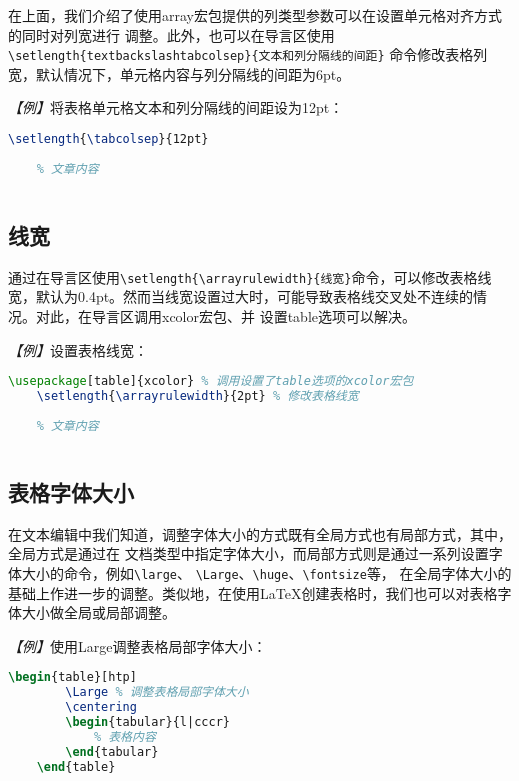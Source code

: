 在上面，我们介绍了使用array宏包提供的列类型参数可以在设置单元格对齐方式的同时对列宽进行
调整。此外，也可以在导言区使用\texttt{\textbackslash{}setlength\{textbackslash{}tabcolsep\}\{文本和列分隔线的间距\}}
命令修改表格列宽，默认情况下，单元格内容与列分隔线的间距为6pt。

\emph{【例】}将表格单元格文本和列分隔线的间距设为12pt：
\begin{lstlisting}[language=TeX]
    \setlength{\tabcolsep}{12pt}
    
    % 文章内容
    
\end{lstlisting}

\subsection{线宽}

通过在导言区使用\texttt{\textbackslash{}setlength\{\textbackslash{}arrayrulewidth\}\{线宽\}}命令，可以修改表格线宽，默认为0.4pt。然而当线宽设置过大时，可能导致表格线交叉处不连续的情况。对此，在导言区调用xcolor宏包、并
设置table选项可以解决。

\emph{【例】}设置表格线宽：
\begin{lstlisting}[language=TeX]
    \usepackage[table]{xcolor} % 调用设置了table选项的xcolor宏包
    \setlength{\arrayrulewidth}{2pt} % 修改表格线宽
    
    % 文章内容
    
\end{lstlisting}

\subsection{表格字体大小}

在文本编辑中我们知道，调整字体大小的方式既有全局方式也有局部方式，其中，全局方式是通过在
文档类型中指定字体大小，而局部方式则是通过一系列设置字体大小的命令，例如\texttt{\textbackslash{large}}、
\texttt{\textbackslash{Large}}、\texttt{\textbackslash{huge}}、\texttt{\textbackslash{fontsize}}等，
在全局字体大小的基础上作进一步的调整。类似地，在使用LaTeX创建表格时，我们也可以对表格字
体大小做全局或局部调整。

\emph{【例】}使用Large调整表格局部字体大小：
\begin{lstlisting}[language=TeX]
    \begin{table}[htp]
        \Large % 调整表格局部字体大小
        \centering
        \begin{tabular}{l|cccr}
            % 表格内容
        \end{tabular}
    \end{table}
\end{lstlisting}

